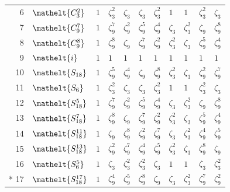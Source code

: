 \documentclass[10pt,a4paper]{article}
\numberwithin{equation}{section}
\newcommand{\eltfont}[1]{{\let\sigma\eltsigma\mathelt{#1}}}
\newcommand{\cls}[1]{\eltfont{#1}}
\newcommand{\rootunity}[1]{\zeta_{#1}}
\begin{document}
{\begin{longtable}{@{}rllllllllll@{}}
6 & $\cls{C_{3}^{2}}$ & $1$ & $\rootunity{3}^{2}$ & $\rootunity{3}$ & $\rootunity{3}$ & $\rootunity{3}^{2}$ & $1$ & $1$ & $\rootunity{3}^{2}$ & $\rootunity{3}$\\
7 & $\cls{C_{9}^{7}}$ & $1$ & $\rootunity{9}^{7}$ & $\rootunity{9}^{2}$ & $\rootunity{9}^{5}$ & $\rootunity{9}^{4}$ & $\rootunity{3}$ & $\rootunity{3}^{2}$ & $\rootunity{9}$ & $\rootunity{9}^{8}$\\
8 & $\cls{C_{9}^{8}}$ & $1$ & $\rootunity{9}^{8}$ & $\rootunity{9}$ & $\rootunity{9}^{7}$ & $\rootunity{9}^{2}$ & $\rootunity{3}^{2}$ & $\rootunity{3}$ & $\rootunity{9}^{5}$ & $\rootunity{9}^{4}$\\
9 & $\cls{i}$ & $1$ & $1$ & $1$ & $1$ & $1$ & $1$ & $1$ & $1$ & $1$\\
10 & $\cls{S_{18}}$ & $1$ & $\rootunity{9}^{5}$ & $\rootunity{9}^{4}$ & $\rootunity{9}$ & $\rootunity{9}^{8}$ & $\rootunity{3}^{2}$ & $\rootunity{3}$ & $\rootunity{9}^{2}$ & $\rootunity{9}^{7}$\\
11 & $\cls{S_{6}}$ & $1$ & $\rootunity{3}^{2}$ & $\rootunity{3}$ & $\rootunity{3}$ & $\rootunity{3}^{2}$ & $1$ & $1$ & $\rootunity{3}^{2}$ & $\rootunity{3}$\\
12 & $\cls{S_{18}^{5}}$ & $1$ & $\rootunity{9}^{7}$ & $\rootunity{9}^{2}$ & $\rootunity{9}^{5}$ & $\rootunity{9}^{4}$ & $\rootunity{3}$ & $\rootunity{3}^{2}$ & $\rootunity{9}$ & $\rootunity{9}^{8}$\\
13 & $\cls{S_{18}^{7}}$ & $1$ & $\rootunity{9}^{8}$ & $\rootunity{9}$ & $\rootunity{9}^{7}$ & $\rootunity{9}^{2}$ & $\rootunity{3}^{2}$ & $\rootunity{3}$ & $\rootunity{9}^{5}$ & $\rootunity{9}^{4}$\\
14 & $\cls{S_{18}^{11}}$ & $1$ & $\rootunity{9}$ & $\rootunity{9}^{8}$ & $\rootunity{9}^{2}$ & $\rootunity{9}^{7}$ & $\rootunity{3}$ & $\rootunity{3}^{2}$ & $\rootunity{9}^{4}$ & $\rootunity{9}^{5}$\\
15 & $\cls{S_{18}^{13}}$ & $1$ & $\rootunity{9}^{2}$ & $\rootunity{9}^{7}$ & $\rootunity{9}^{4}$ & $\rootunity{9}^{5}$ & $\rootunity{3}^{2}$ & $\rootunity{3}$ & $\rootunity{9}^{8}$ & $\rootunity{9}$\\
16 & $\cls{S_{6}^{5}}$ & $1$ & $\rootunity{3}$ & $\rootunity{3}^{2}$ & $\rootunity{3}^{2}$ & $\rootunity{3}$ & $1$ & $1$ & $\rootunity{3}$ & $\rootunity{3}^{2}$\\*
17 & $\cls{S_{18}^{17}}$ & $1$ & $\rootunity{9}^{4}$ & $\rootunity{9}^{5}$ & $\rootunity{9}^{8}$ & $\rootunity{9}$ & $\rootunity{3}$ & $\rootunity{3}^{2}$ & $\rootunity{9}^{7}$ & $\rootunity{9}^{2}$\\
\bottomrule\end{longtable}}
\end{document}
